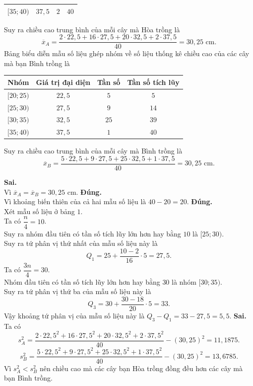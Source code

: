\begin{ex}
{\begin{center}
\begin{tabular}{|c|c|c|c|}
				$[35 ; 40)$ & $37{,} 5$& $2$ & $40$\\
				\hline
			\end{tabular}
		\end{center}
		Suy ra chiều cao trung bình của mỗi cây mà Hòa trồng là $$\overline{x}_A= \dfrac{2 \cdot 22{,}5 + 16 \cdot 27{,}5 + 20 \cdot 32{,}5 + 2 \cdot 37{,} 5}{40}= 30{,} 25 \text{ cm}.$$
		Bảng biểu diễn mẫu số liệu ghép nhóm về số liệu thống kê chiều cao của các cây mà bạn Bình trồng là
		\begin{center}
			\begin{tabular}{|c|c|c|c|}
				\hline
				Nhóm & Giá trị đại diện & Tần số & Tần số tích lũy\\
				\hline
				$[20 ; 25)$ & $22{,} 5$& $5$ & $5$ \\
				$[25 ; 30)$ & $27{,} 5$ & $9$ & $14$\\
				$[30 ; 35)$ & $32{,} 5$ & $25$ & $39$\\
				$[35 ; 40)$ & $37{,} 5$& $1$ & $40$\\
				\hline
			\end{tabular}
		\end{center}
		Suy ra chiều cao trung bình của mỗi cây mà Bình trồng là $$\overline{x}_B= \dfrac{5 \cdot 22{,}5 + 9 \cdot 27{,}5 + 25 \cdot 32{,}5 + 1\cdot 37{,} 5}{40}= 30{,} 25 \text{ cm}.$$
		\begin{itemchoice}
			\itemch \textbf{Sai.}\\ Vì $\overline{x}_A= \overline{x}_B= 30{,} 25$ cm.
			\itemch \textbf{Đúng.}\\ Vì khoảng biến thiên của cả hai mẫu số liệu là $40-20=20$.
			\itemch \textbf{Đúng.}\\
			Xét mẫu số liệu ở bảng $1$.\\
			Ta có $\dfrac{n}{4} = 10$.\\
			Suy ra nhóm đầu tiên có tần số tích lũy lớn hơn hay bằng $10$ là $ [25; 30)$.\\
			Suy ra tứ phân vị thứ nhất của mẫu số liệu này là $$Q_1= 25 +\dfrac{10 - 2}{16} \cdot 5=27{,}5.$$
			Ta có $\dfrac{3n}{4}= 30$.\\
			Nhóm đầu tiên có tần số tích lũy lớn hơn hay bằng $30$ là nhóm $[30; 35)$.\\
			Suy ra tứ phân vị thứ ba của mẫu số liệu này là $$Q_3= 30 +\dfrac{30- 18}{20} \cdot 5=33.$$
			Vậy khoảng tứ phân vị của mẫu số liệu này là $Q_3-Q_1= 33- 27{,}5 = 5{,}5.$ 
			\itemch \textbf{Sai.}\\
			Ta có $$s^2_A = \dfrac{2 \cdot 22{,}5^2 + 16 \cdot 27{,}5^2 + 20 \cdot 32{,}5^2 + 2 \cdot 37{,} 5^2}{40} - (30{,} 25)^2= 11{,} 1875.$$
			$$s^2_B=\dfrac{5 \cdot 22{,}5^2 + 9 \cdot 27{,}5^2 + 25 \cdot 32{,}5^2 + 1\cdot 37{,} 5^2}{40}-(30{,}25)^2= 13{,} 6785.$$
			Vì $s_A^2 <s_B^2$ nên chiều cao mà các cây bạn Hòa trồng đồng đều hơn các cây mà bạn Bình trồng.
	\end{itemchoice}}
\end{ex}

